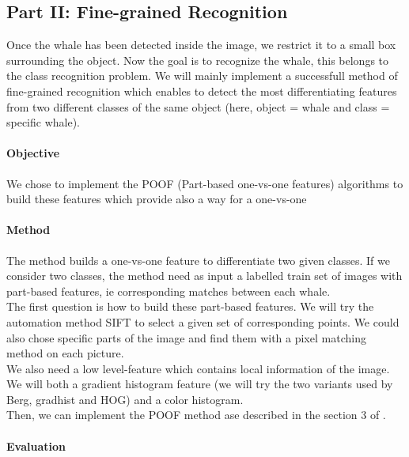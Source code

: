 \documentclass[11pt,a4paper,oneside]{report}
\begin{document}
\subsection*{Part II: Fine-grained Recognition}
Once the whale has been detected inside the image, we restrict it to a small box surrounding the object. Now the goal is to recognize the whale, this belongs to the class recognition problem. We will mainly implement a successfull method of fine-grained recognition which enables to detect the most differentiating features from two different classes of the same object (here, object = whale and class = specific whale).

\paragraph{Objective}

We chose to implement the POOF (Part-based one-vs-one features) algorithms to build these features which provide also a way for a one-vs-one

\paragraph{Method}

The method builds a one-vs-one feature to differentiate two given classes.
If we consider two classes, the method need as input a labelled train set of images with part-based features, ie corresponding matches between each whale.\\

The first question is how to build these part-based features. We will try the automation method SIFT to select a given set of corresponding points. We could also chose specific parts of the image and find them with a pixel matching method on each picture.\\

We also need a low level-feature which contains local information of the image. We will both a gradient histogram feature (we will try the two variants used by Berg, gradhist and HOG) and a color histogram.\\

Then, we can implement the POOF method ase described in the section 3 of \cite{berg-poof-cvpr2013}.

\paragraph{Evaluation}
\end{document}
